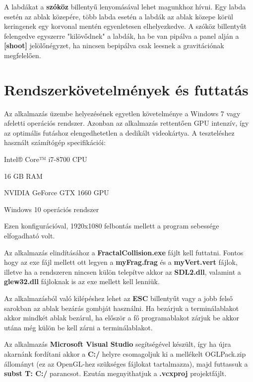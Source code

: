 A labdákat a \textbf{szóköz} billentyű lenyomásával lehet magunkhoz hívni. Egy labda esetén az ablak közepére, több labda esetén a labdák az ablak közepe körül keringenek egy korvonal mentén egyenletesen elhelyezkedve. A szóköz billentyűt felengedve egyszerre "kilövődnek" a labdák, ha be van pipálva a panel alján a \textbf{[shoot]} jelölőnégyzet, ha nincsen bepipálva csak leesnek a gravitációnak megfelelően.
 
\cleardoublepage
\section{Rendszerkövetelmények és futtatás} 

Az alkalmazás üzembe helyezésének egyetlen követelménye a Windows 7 vagy afeletti operációs rendszer. Azonban az alkalmazás rettentően GPU intenzív, így az optimális futáshoz elengedhetetlen a dedikált videokártya. A teszteléshez használt számítógép specifikációi:
\begin{compactitem}
	\item Intel® Core™ i7-8700 CPU
	\item 16 GB RAM
	\item NVIDIA GeForce GTX 1660 GPU
	\item Windows 10 operációs rendszer
\end{compactitem}
Ezen konfigurációval, 1920x1080 felbontás mellett a program sebessége elfogadható volt.

Az alkalmazás elindításához a \textbf{FractalCollision.exe} fájlt kell futtatni. Fontos hogy az exe fájl mellett ott legyen a \textbf{myFrag.frag} és a \textbf{myVert.vert} fájlok, illetve ha a rendszeren nincsen külön telepítve akkor az \textbf{SDL2.dll}, valamint a \textbf{glew32.dll} fájloknak is az exe mellett kell lenniük. 

Az alkalmazásból való kilépéshez lehet az \textbf{ESC} billentyűt vagy a jobb felső sarokban az ablak bezárás gombját használni. Ha bezárjuk a terminálablakot akkor mindkét ablak bezárul, ha először a fő programablakot zárjuk be akkor utána még külön be kell zárni a terminálablakot.

Az alkalmazás \textbf{Microsoft Visual Studio} segítségével készült, így ha újra akarnánk fordítani akkor a \textbf{C:/} helyre csomagoljuk ki a mellékelt OGLPack.zip állományt (ez az OpenGL-hez szükséges fájlokat tartalmazza), majd futtassuk a \textbf{subst T: C:/} parancsot. Ezután megnyithatjuk a \textbf{.vcxproj} projektfájlt.


